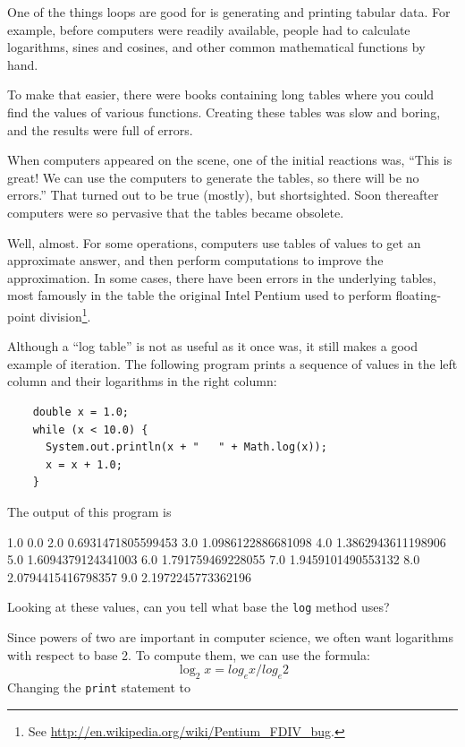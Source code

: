 \documentclass[12pt]{book}
\theoremstyle{exercise}
\begin{document}
One of the things loops are good for is generating and printing
tabular data.  For example, before computers were readily
available, people had to calculate logarithms,
sines and cosines, and other common mathematical functions
by hand.

To make that easier, there were books containing long tables
where you could find the values of various functions.
Creating these tables was slow and boring, and the results
were full of errors.

When computers appeared on the scene, one of the initial reactions
was, ``This is great!  We can use the computers to generate the
tables, so there will be no errors.''  That turned out to be true
(mostly), but shortsighted.  Soon thereafter computers were so
pervasive that the tables became obsolete.

Well, almost.  For some operations, computers use tables of values to
get an approximate answer, and then perform computations to improve
the approximation.  In some cases, there have been errors in the
underlying tables, most famously in the table the original Intel
Pentium used to perform floating-point division\footnote{See
  \url{http://en.wikipedia.org/wiki/Pentium_FDIV_bug}.}.


Although a ``log table'' is not as useful as it once was, it still
makes a good example of iteration.  The following program prints a
sequence of values in the left column and their logarithms in the
right column:

\begin{lstlisting}
    double x = 1.0;
    while (x < 10.0) {
      System.out.println(x + "   " + Math.log(x));
      x = x + 1.0;
    }
\end{lstlisting}
%
The output of this program is

\begin{verbatimtab}
1.0   0.0
2.0   0.6931471805599453
3.0   1.0986122886681098
4.0   1.3862943611198906
5.0   1.6094379124341003
6.0   1.791759469228055
7.0   1.9459101490553132
8.0   2.0794415416798357
9.0   2.1972245773362196
\end{verbatimtab}
%
Looking at these values, can you tell what base the {\tt log}
method uses?

Since powers of two are important
in computer science, we often want logarithms with
respect to base 2.  To compute them, we can use the formula:
%
\begin{equation*}
\log_2 x = log_e x / log_e 2
\end{equation*}
%
Changing the {\tt print} statement to
\end{document}
